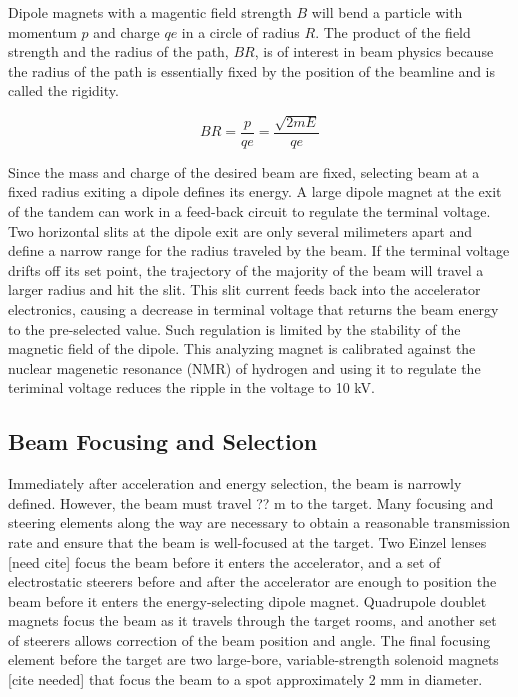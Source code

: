 Dipole magnets with a magentic field strength $B$ will bend a particle with momentum $p$ and charge $qe$ in a circle of radius $R$.  The product of the field strength and the radius of the path, $BR$, is of interest in beam physics because the radius of the path is essentially fixed by the position of the beamline and is called the rigidity.

\begin{equation}
BR = \frac{p}{qe} = \frac{\sqrt{2mE}}{qe}
\label{eqn:rigidity}
\end{equation}

Since the mass and charge of the desired beam are fixed, selecting beam at a fixed radius exiting a dipole defines its energy.  A large dipole magnet at the exit of the tandem can work in a feed-back circuit to regulate the terminal voltage.  Two horizontal slits at the dipole exit are only several milimeters apart and define a narrow range for the radius traveled by the beam.  If the terminal voltage drifts off its set point, the trajectory of the majority of the beam will travel a larger radius and hit the slit.  This slit current feeds back into the accelerator electronics, causing a decrease in terminal voltage that returns the beam energy to the pre-selected value.  Such regulation is limited by the stability of the magnetic field of the dipole.  This analyzing magnet is calibrated against the nuclear magenetic resonance (NMR) of hydrogen and using it to regulate the teriminal voltage reduces the ripple in the voltage to 10 kV.


\subsection{Beam Focusing and Selection}

Immediately after acceleration and energy selection, the beam is narrowly defined.  However, the beam must travel ?? m  to the target.  Many focusing and steering elements along the way are necessary to obtain a reasonable transmission rate and ensure that the beam is well-focused at the target.  Two Einzel lenses [need cite] focus the beam before it enters the accelerator, and a set of electrostatic steerers before and after the accelerator are enough to position the beam before it enters the energy-selecting dipole magnet.  Quadrupole doublet magnets focus the beam as it travels through the target rooms, and another set of steerers allows correction of the beam position and angle.  The final focusing element before the target are two large-bore, variable-strength solenoid magnets [cite needed] that focus the beam to a spot approximately 2 mm in diameter.

